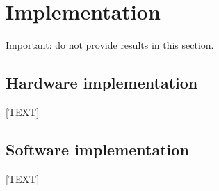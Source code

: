\chapter{Implementation}

Important: do not provide results in this section.

\section{Hardware implementation}

[TEXT]


\section{Software implementation}

[TEXT]
